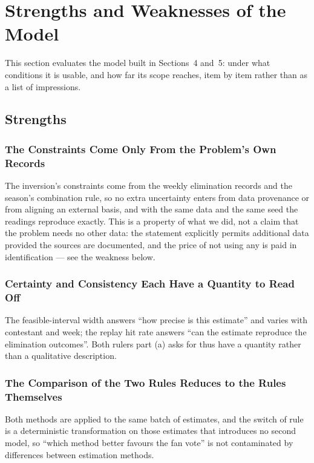 \section{Strengths and Weaknesses of the Model}
\label{sec:sw}


This section evaluates the model built in Sections~4 and~5: under what conditions it is usable, and how far its scope reaches, item by item rather than as a list of impressions.

\subsection{Strengths}

\subsubsection{The Constraints Come Only From the Problem's Own Records}
The inversion's constraints come from the weekly elimination records and the season's combination rule, so no extra uncertainty enters from data provenance or from aligning an external basis, and with the same data and the same seed the readings reproduce exactly. This is a property of what we did, not a claim that the problem needs no other data: the statement explicitly permits additional data provided the sources are documented, and the price of not using any is paid in identification --- see the weakness below.

\subsubsection{Certainty and Consistency Each Have a Quantity to Read Off}
The feasible-interval width answers ``how precise is this estimate'' and varies with contestant and week; the replay hit rate answers ``can the estimate reproduce the elimination outcomes''. Both rulers part (a) asks for thus have a quantity rather than a qualitative description.

\subsubsection{The Comparison of the Two Rules Reduces to the Rules Themselves}
Both methods are applied to the same batch of estimates, and the switch of rule is a deterministic transformation on those estimates that introduces no second model, so ``which method better favours the fan vote'' is not contaminated by differences between estimation methods.

